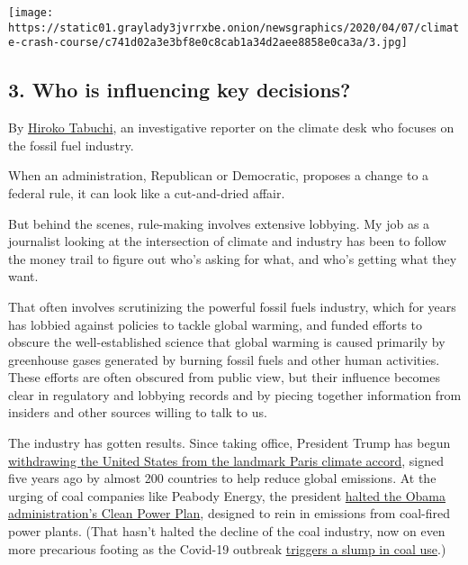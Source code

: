 \texttt{[image: https://static01.graylady3jvrrxbe.onion/newsgraphics/2020/04/07/climate-crash-course/c741d02a3e3bf8e0c8cab1a34d2aee8858e0ca3a/3.jpg]}

\hypertarget{3-who-is-influencing-key-decisions}{%
\subsection{\texorpdfstring{\textbf{3.} Who is influencing key
decisions?}{3. Who is influencing key decisions?}}\label{3-who-is-influencing-key-decisions}}

By \href{https://www.nytimes3xbfgragh.onion/by/hiroko-tabuchi}{Hiroko
Tabuchi}, an investigative reporter on the climate desk who focuses on
the fossil fuel industry.

When an administration, Republican or Democratic, proposes a change to a
federal rule, it can look like a cut-and-dried affair.

But behind the scenes, rule-making involves extensive lobbying. My job
as a journalist looking at the intersection of climate and industry has
been to follow the money trail to figure out who's asking for what, and
who's getting what they want.

That often involves scrutinizing the powerful fossil fuels industry,
which for years has lobbied against policies to tackle global warming,
and funded efforts to obscure the well-established science that global
warming is caused primarily by greenhouse gases generated by burning
fossil fuels and other human activities. These efforts are often
obscured from public view, but their influence becomes clear in
regulatory and lobbying records and by piecing together information from
insiders and other sources willing to talk to us.

The industry has gotten results. Since taking office, President Trump
has begun
\href{https://www.nytimes3xbfgragh.onion/2019/10/23/climate/trump-paris-climate-accord.html}{withdrawing
the United States from the landmark Paris climate accord}, signed five
years ago by almost 200 countries to help reduce global emissions. At
the urging of coal companies like Peabody Energy, the president
\href{https://www.nytimes3xbfgragh.onion/2017/10/09/climate/clean-power-plan.html}{halted
the Obama administration's Clean Power Plan}, designed to rein in
emissions from coal-fired power plants. (That hasn't halted the decline
of the coal industry, now on even more precarious footing as the
Covid-19 outbreak
\href{https://www.nytimes3xbfgragh.onion/2020/04/07/business/energy-environment/coronavirus-oil-wind-solar-energy.html}{triggers
a slump in coal use}.)

